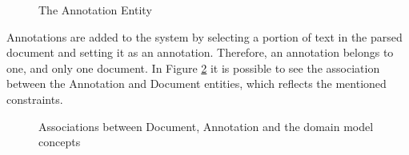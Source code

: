 \begin{figure}[h]
\centering
\renewcommand {\umltextcolor}{black}
\renewcommand {\umlfillcolor}{none}
\renewcommand {\umldrawcolor}{black}

\caption{The Annotation Entity}
\label{figure:annotationEntity}
\end{figure}

Annotations are added to the system by selecting a portion of text in the parsed document and setting it as an annotation. Therefore, an annotation belongs to one, and only one document. In Figure \ref{figure:documentAnnotationConcepts} it is possible to see the association between the Annotation and Document entities, which reflects the mentioned constraints.

\begin{figure}[h]
\centering
\renewcommand {\umltextcolor}{black}
\renewcommand {\umlfillcolor}{none}
\renewcommand {\umldrawcolor}{black}

\caption{Associations between Document, Annotation and the domain model concepts}
\label{figure:documentAnnotationConcepts}
\end{figure}

